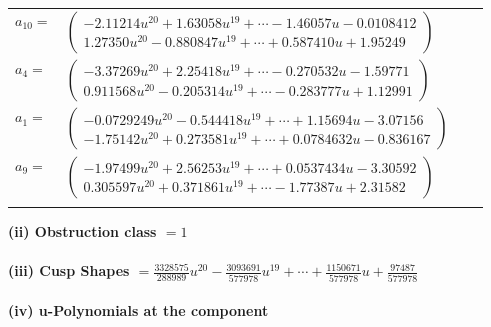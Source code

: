 \documentclass[1p]{elsarticle_modified}
\theoremstyle{definition}
\begin{document}
\begin{tabular}{m{7pt} m{180pt} m{7pt} m{180pt} }
\flushright $a_{10}=$&$\begin{pmatrix}-2.11214 u^{20}+1.63058 u^{19}+\cdots-1.46057 u-0.0108412\\1.27350 u^{20}-0.880847 u^{19}+\cdots+0.587410 u+1.95249\end{pmatrix}$ \\
\flushright $a_{4}=$&$\begin{pmatrix}-3.37269 u^{20}+2.25418 u^{19}+\cdots-0.270532 u-1.59771\\0.911568 u^{20}-0.205314 u^{19}+\cdots-0.283777 u+1.12991\end{pmatrix}$ \\
\flushright $a_{1}=$&$\begin{pmatrix}-0.0729249 u^{20}-0.544418 u^{19}+\cdots+1.15694 u-3.07156\\-1.75142 u^{20}+0.273581 u^{19}+\cdots+0.0784632 u-0.836167\end{pmatrix}$ \\
\flushright $a_{9}=$&$\begin{pmatrix}-1.97499 u^{20}+2.56253 u^{19}+\cdots+0.0537434 u-3.30592\\0.305597 u^{20}+0.371861 u^{19}+\cdots-1.77387 u+2.31582\end{pmatrix}$\\&\end{tabular}
\flushleft \textbf{(ii) Obstruction class $= 1$}\\~\\
\flushleft \textbf{(iii) Cusp Shapes $= \frac{3328575}{288989} u^{20}-\frac{3093691}{577978} u^{19}+\cdots+\frac{1150671}{577978} u+\frac{97487}{577978}$}\\~\\
\newpage\renewcommand{\arraystretch}{1}
\flushleft \textbf{(iv) u-Polynomials at the component}\newline \\
\end{document}
